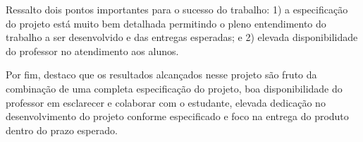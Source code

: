 Ressalto dois pontos importantes para o sucesso do trabalho: 1) a especificação do projeto está muito bem detalhada 
permitindo o pleno entendimento do trabalho a ser desenvolvido e das entregas esperadas; e 2) elevada disponibilidade 
do professor no atendimento aos alunos.

Por fim, destaco que os resultados alcançados nesse projeto são fruto da combinação de uma completa especificação 
do projeto, boa disponibilidade do professor em esclarecer e colaborar com o estudante,
elevada dedicação no desenvolvimento do projeto conforme especificado e foco na entrega do produto dentro do prazo
esperado.

